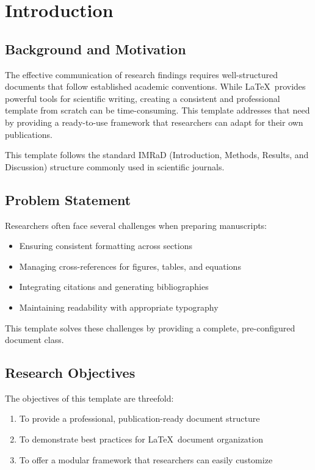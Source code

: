 \section{Introduction}

\subsection{Background and Motivation}

The effective communication of research findings requires well-structured documents that follow established academic conventions. While \LaTeX\ provides powerful tools for scientific writing, creating a consistent and professional template from scratch can be time-consuming. This template addresses that need by providing a ready-to-use framework that researchers can adapt for their own publications.

\begin{important}
This template follows the standard IMRaD (Introduction, Methods, Results, and Discussion) structure commonly used in scientific journals.
\end{important}

\subsection{Problem Statement}

Researchers often face several challenges when preparing manuscripts:

\begin{itemize}
    \item Ensuring consistent formatting across sections
    \item Managing cross-references for figures, tables, and equations
    \item Integrating citations and generating bibliographies
    \item Maintaining readability with appropriate typography
\end{itemize}

This template solves these challenges by providing a complete, pre-configured document class.

\subsection{Research Objectives}

The objectives of this template are threefold:

\begin{enumerate}
    \item To provide a professional, publication-ready document structure
    \item To demonstrate best practices for \LaTeX\ document organization
    \item To offer a modular framework that researchers can easily customize
\end{enumerate}


